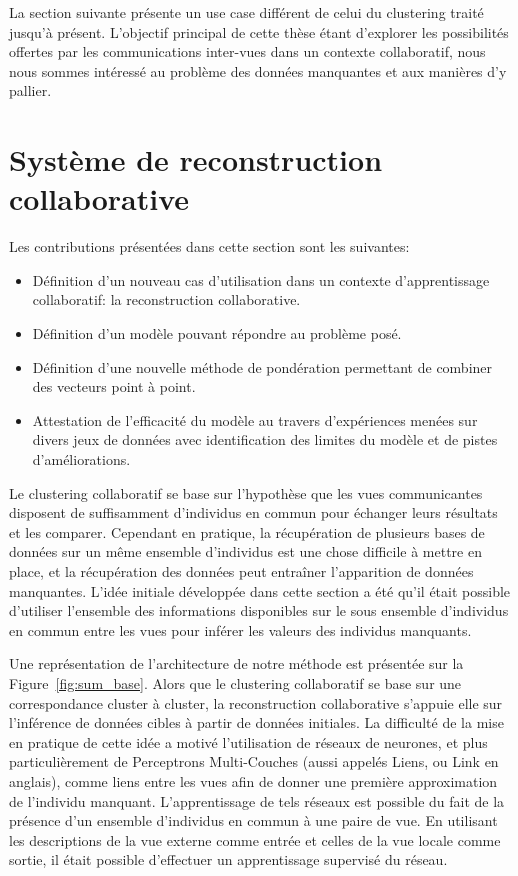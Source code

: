 \documentclass[a4paper]{article}
\begin{document}
    La section suivante présente un use case différent de celui du clustering traité jusqu'à présent. L'objectif principal de cette thèse étant d'explorer les possibilités offertes par les communications inter-vues dans un contexte collaboratif, nous nous sommes intéressé au problème des données manquantes et aux manières d'y pallier.

\section{Système de reconstruction collaborative}

Les contributions présentées dans cette section sont les suivantes:
\begin{itemize}
    \item Définition d'un nouveau cas d'utilisation dans un contexte d'apprentissage collaboratif: la reconstruction collaborative.
    \item Définition d'un modèle pouvant répondre au problème posé.
    \item Définition d'une nouvelle méthode de pondération permettant de combiner des vecteurs point à point.
    \item Attestation de l'efficacité du modèle au travers d'expériences menées sur divers jeux de données avec identification des limites du modèle et de pistes d'améliorations.
\end{itemize}

Le clustering collaboratif se base sur l'hypothèse que les vues communicantes disposent de suffisamment d'individus en commun pour échanger leurs résultats et les comparer. Cependant en pratique, la récupération de plusieurs bases de données sur un même ensemble d'individus est une chose difficile à mettre en place, et la récupération des données peut entraîner l'apparition de données manquantes. L'idée initiale développée dans cette section a été qu'il était possible d'utiliser l'ensemble des informations disponibles sur le sous ensemble d'individus en commun entre les vues pour inférer les valeurs des individus manquants.

Une représentation de l'architecture de notre méthode est présentée sur la Figure~\ref{fig:sum_base}. Alors que le clustering collaboratif se base sur une correspondance cluster à cluster, la reconstruction collaborative s'appuie elle sur l'inférence de données cibles à partir de données initiales. La difficulté de la mise en pratique de cette idée a motivé l'utilisation de réseaux de neurones, et plus particulièrement de Perceptrons Multi-Couches (aussi appelés Liens, ou Link en anglais), comme liens entre les vues afin de donner une première approximation de l'individu manquant. L'apprentissage de tels réseaux est possible du fait de la présence d'un ensemble d'individus en commun à une paire de vue. En utilisant les descriptions de la vue externe comme entrée et celles de la vue locale comme sortie, il était possible d'effectuer un apprentissage supervisé du réseau.
\end{document}
